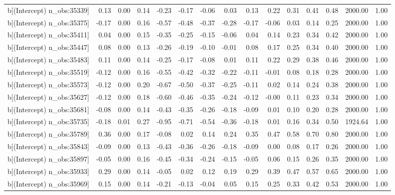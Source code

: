 \begin{table}[ht]
\begin{tabular}{rrrrrrrrrrrrrrr}
  b[(Intercept) n\_obs:35339] & 0.13 & 0.00 & 0.14 & -0.23 & -0.17 & -0.06 & 0.03 & 0.13 & 0.22 & 0.31 & 0.41 & 0.48 & 2000.00 & 1.00 \\ 
  b[(Intercept) n\_obs:35375] & -0.17 & 0.00 & 0.16 & -0.57 & -0.48 & -0.37 & -0.28 & -0.17 & -0.06 & 0.03 & 0.14 & 0.25 & 2000.00 & 1.00 \\ 
  b[(Intercept) n\_obs:35411] & 0.04 & 0.00 & 0.15 & -0.35 & -0.25 & -0.15 & -0.06 & 0.04 & 0.14 & 0.23 & 0.34 & 0.42 & 2000.00 & 1.00 \\ 
  b[(Intercept) n\_obs:35447] & 0.08 & 0.00 & 0.13 & -0.26 & -0.19 & -0.10 & -0.01 & 0.08 & 0.17 & 0.25 & 0.34 & 0.40 & 2000.00 & 1.00 \\ 
  b[(Intercept) n\_obs:35483] & 0.11 & 0.00 & 0.14 & -0.25 & -0.17 & -0.08 & 0.01 & 0.11 & 0.22 & 0.29 & 0.38 & 0.46 & 2000.00 & 1.00 \\ 
  b[(Intercept) n\_obs:35519] & -0.12 & 0.00 & 0.16 & -0.55 & -0.42 & -0.32 & -0.22 & -0.11 & -0.01 & 0.08 & 0.18 & 0.28 & 2000.00 & 1.00 \\ 
  b[(Intercept) n\_obs:35573] & -0.12 & 0.00 & 0.20 & -0.67 & -0.50 & -0.37 & -0.25 & -0.11 & 0.02 & 0.14 & 0.24 & 0.38 & 2000.00 & 1.00 \\ 
  b[(Intercept) n\_obs:35627] & -0.12 & 0.00 & 0.18 & -0.60 & -0.46 & -0.35 & -0.24 & -0.12 & -0.00 & 0.11 & 0.23 & 0.34 & 2000.00 & 1.00 \\ 
  b[(Intercept) n\_obs:35681] & -0.08 & 0.00 & 0.14 & -0.43 & -0.35 & -0.26 & -0.18 & -0.09 & 0.01 & 0.10 & 0.20 & 0.28 & 2000.00 & 1.00 \\ 
  b[(Intercept) n\_obs:35735] & -0.18 & 0.01 & 0.27 & -0.95 & -0.71 & -0.54 & -0.36 & -0.18 & 0.01 & 0.16 & 0.34 & 0.50 & 1924.64 & 1.00 \\ 
  b[(Intercept) n\_obs:35789] & 0.36 & 0.00 & 0.17 & -0.08 & 0.02 & 0.14 & 0.24 & 0.35 & 0.47 & 0.58 & 0.70 & 0.80 & 2000.00 & 1.00 \\ 
  b[(Intercept) n\_obs:35843] & -0.09 & 0.00 & 0.13 & -0.43 & -0.36 & -0.26 & -0.18 & -0.09 & 0.00 & 0.08 & 0.17 & 0.26 & 2000.00 & 1.00 \\ 
  b[(Intercept) n\_obs:35897] & -0.05 & 0.00 & 0.16 & -0.45 & -0.34 & -0.24 & -0.15 & -0.05 & 0.06 & 0.15 & 0.26 & 0.35 & 2000.00 & 1.00 \\ 
  b[(Intercept) n\_obs:35933] & 0.29 & 0.00 & 0.14 & -0.05 & 0.02 & 0.12 & 0.19 & 0.29 & 0.39 & 0.47 & 0.57 & 0.65 & 2000.00 & 1.00 \\ 
  b[(Intercept) n\_obs:35969] & 0.15 & 0.00 & 0.14 & -0.21 & -0.13 & -0.04 & 0.05 & 0.15 & 0.25 & 0.33 & 0.42 & 0.53 & 2000.00 & 1.00 \\ 

\end{tabular}
\end{table}
